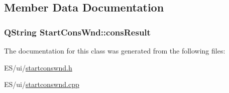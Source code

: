 \subsection{Member Data Documentation}
\hypertarget{class_start_cons_wnd_a661a5bfb42d4620940a714731be40cca}{
\subsubsection[{consResult}]{\setlength{\rightskip}{0pt plus 5cm}QString {\bf StartConsWnd::consResult}}}
\label{class_start_cons_wnd_a661a5bfb42d4620940a714731be40cca}


The documentation for this class was generated from the following files:\begin{DoxyCompactItemize}
\item 
ES/ui/\hyperlink{startconswnd_8h}{startconswnd.h}\item 
ES/ui/\hyperlink{startconswnd_8cpp}{startconswnd.cpp}\end{DoxyCompactItemize}
